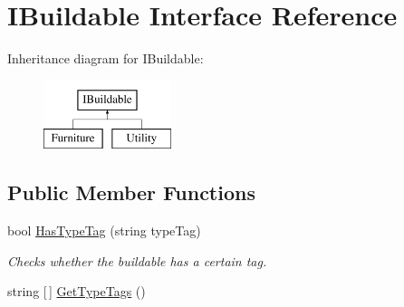 \hypertarget{interface_i_buildable}{}\section{I\+Buildable Interface Reference}
\label{interface_i_buildable}
Inheritance diagram for I\+Buildable\+:\begin{figure}[H]
\begin{center}
\leavevmode
\includegraphics[height=2.000000cm]{interface_i_buildable}
\end{center}
\end{figure}
\subsection*{Public Member Functions}
\begin{DoxyCompactItemize}
\item 
bool \hyperlink{interface_i_buildable_a4569a897fc2ac7c0ecfaddc518fa346f}{Has\+Type\+Tag} (string type\+Tag)
\begin{DoxyCompactList}\small\item\em Checks whether the buildable has a certain tag. \end{DoxyCompactList}\item 
string \mbox{[}$\,$\mbox{]} \hyperlink{interface_i_buildable_ab1f899fc1d9ece21b46612d6119f744d}{Get\+Type\+Tags} ()
\end{DoxyCompactItemize}
